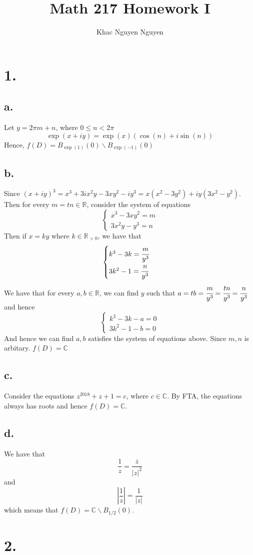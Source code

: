 \documentclass[11pt]{article}
\title{\textbf{Math 217 Homework I}}
\author{Khac Nguyen Nguyen}
\date{}
\begin{document}
\section*{1.}
\subsection*{a.}
Let $y = 2\pi m+n$, where $0\le n<2\pi$
\[
    \exp(x +iy) = \exp(x) (\cos(n) + i\sin(n)) 
\]
Hence, $f(D) = B_{\exp(1)}(0) \backslash B_{\exp(-1)}(0)$
\subsection*{b.}
Since $(x+iy)^3 = x^3 +3ix^2y - 3xy^2 - iy^3 = x(x^2-3y^2) + iy(3x^2 - y^2)$.
Then for every $m = tn \in \mathbb{R}$, consider the system of equations
\[
    \begin{cases}
        x^3 - 3xy^2 = m\\
        3x^2y-y^3= n
    \end{cases}    
\]
Then if $x=ky$ where $k \in \mathbb{R}_{>0}$, we have that 
\[
    \begin{cases}
        k^3 - 3k = \cfrac{m}{y^3} \\
        3k^2 - 1 = \cfrac{n}{y^3} 
    \end{cases}
\]
We have that for every $a,b \in \mathbb{R}$, we can find $y$ such that $a = tb = \cfrac{m}{y^3} = \cfrac{tn}{y^3} =\cfrac{n}{y^3}$
and hence
\[
    \begin{cases}
        k^3 - 3k - a = 0\\
        3k^2 - 1 - b = 0
    \end{cases}
\]
And hence we can find $a,b$ satisfies the system of equations above. Since $m,n$ is arbitary. $f(D) = \mathbb{C}$
\subsection*{c.}
Consider the equations $z^{2018} + z + 1 = c$, where $c \in \mathbb{C}$. By FTA, the equations always has roots and hence $f(D) = \mathbb{C}$.
\subsection*{d.}
We have that 
\[
    \frac{1}{z} = \frac{\overline{z}}{|z|^2}    
\]
and 
\[
    \left| \frac{1}{z} \right| = \frac{1}{|z|}
\]
which means that $f(D) = \mathbb{C} \backslash B_{1/2}(0)$. 
\section*{2.}
\end{document}
